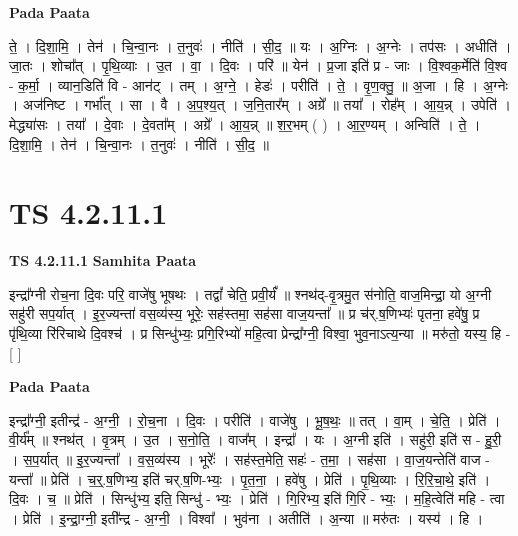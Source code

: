\documentclass[17pt]{extarticle}
\begin{document}
\textbf{Pada Paata} \newline

ते॒ । दि॒शा॒मि॒ । तेन॑ । चि॒न्वा॒नः । त॒नुवः॑ । नीति॑ । सी॒द॒ ॥ यः । अ॒ग्निः । अ॒ग्नेः । तप॑सः । अधीति॑ । जा॒तः । शोचा᳚त् । पृ॒थि॒व्याः । उ॒त । वा॒ । दि॒वः । परि॑ ॥ येन॑ । प्र॒जा इति॑ प्र - जाः । वि॒श्वक॒र्मेति॑ वि॒श्व - क॒र्मा॒ । व्यान॒डिति॑ वि - आन॑ट् । तम् । अ॒ग्ने॒ । हेडः॑ । परीति॑ । ते॒ । वृ॒ण॒क्तु॒ ॥ अ॒जा । हि । अ॒ग्नेः । अज॑निष्ट । गर्भा᳚त् । सा । वै । अ॒प॒श्य॒त् । ज॒नि॒तार᳚म् । अग्रे᳚ ॥ तया᳚ । रोह᳚म् । आ॒य॒न्न् । उपेति॑ । मेद्ध्या॑सः । तया᳚ । दे॒वाः । दे॒वता᳚म् । अग्रे᳚ । आ॒य॒न्न् ॥ श॒र॒भम् ( ) । आ॒र॒ण्यम् । अन्विति॑ । ते॒ । दि॒शा॒मि॒ । तेन॑ । चि॒न्वा॒नः । त॒नुवः॑ । नीति॑ । सी॒द॒ ॥  \newline




\section*{ TS 4.2.11.1 }

\textbf{TS 4.2.11.1 } \newline
\textbf{Samhita Paata} \newline

इन्द्रा᳚ग्नी रोच॒ना दि॒वः परि॒ वाजे॑षु भूषथः । तद्वां᳚ चेति॒ प्रवी॒र्यं᳚ ॥ श्नथ॑द्-वृ॒त्रमु॒त स॑नोति॒ वाज॒मिन्द्रा॒ यो अ॒ग्नी सहु॑री सप॒र्यात् । इ॒र॒ज्यन्ता॑ वस॒व्य॑स्य॒ भूरेः॒ सह॑स्तमा॒ सह॑सा वाज॒यन्ता᳚ ॥ प्र च॑र्.ष॒णिभ्यः॑ पृतना॒ हवे॑षु॒ प्र पृ॑थि॒व्या रि॑रिचाथे दि॒वश्च॑ । प्र सिन्धु॑भ्यः॒ प्रगि॒रिभ्यो॑ महि॒त्वा प्रेन्द्रा᳚ग्नी॒ विश्वा॒ भुव॒नाऽत्य॒न्या ॥ मरु॑तो॒ यस्य॒ हि - [  ] \newline

\textbf{Pada Paata} \newline

इन्द्रा᳚ग्नी॒ इतीन्द्र॑ - अ॒ग्नी॒ । रो॒च॒ना । दि॒वः । परीति॑ । वाजे॑षु । भू॒ष॒थः॒ ॥ तत् । वा॒म् । चे॒ति॒ । प्रेति॑ । वी॒र्य᳚म् ॥ श्नथ॑त् । वृ॒त्रम् । उ॒त । स॒नो॒ति॒ । वाज᳚म् । इन्द्रा᳚ । यः । अ॒ग्नी इति॑ । सहु॑री॒ इति॑ स - हु॒री॒ । स॒प॒र्यात् ॥ इ॒र॒ज्यन्ता᳚ । व॒स॒व्य॑स्य । भूरेः᳚ । सह॑स्त॒मेति॒ सहः॑ - त॒मा॒ । सह॑सा । वा॒ज॒यन्तेति॑ वाज - यन्ता᳚ ॥ प्रेति॑ । च॒र्॒.ष॒णिभ्य॒ इति॑ चर्.ष॒णि-भ्यः॒ । पृ॒त॒ना॒ । हवे॑षु । प्रेति॑ । पृ॒थि॒व्याः । रि॒रि॒चा॒थे॒ इति॑ । दि॒वः । च॒ ॥ प्रेति॑ । सिन्धु॑भ्य॒ इति॒ सिन्धु॑ - भ्यः॒ । प्रेति॑ । गि॒रिभ्य॒ इति॑ गि॒रि - भ्यः॒ । म॒हि॒त्वेति॑ महि - त्वा । प्रेति॑ । इ॒न्द्रा॒ग्नी॒ इती᳚न्द्र - अ॒ग्नी॒ । विश्वा᳚ । भुव॑ना । अतीति॑ । अ॒न्या ॥ मरु॑तः । यस्य॑ । हि ।  \newline
\end{document}
